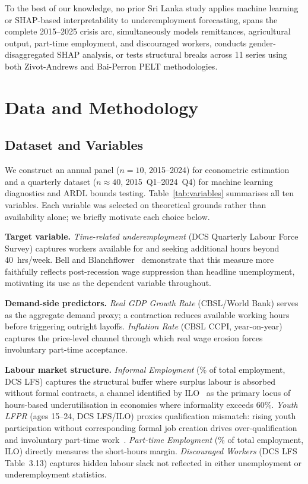 \documentclass[sigconf]{acmart}
\begin{document}
To the best of our knowledge, no prior Sri Lanka study applies machine
learning or SHAP-based interpretability to underemployment forecasting,
spans the complete 2015--2025 crisis arc, simultaneously models remittances,
agricultural output, part-time employment, and discouraged workers, conducts
gender-disaggregated SHAP analysis, or tests structural breaks across
11 series using both Zivot-Andrews and Bai-Perron PELT methodologies.

\section{Data and Methodology}

\subsection{Dataset and Variables}

We construct an annual panel ($n{=}10$, 2015--2024) for econometric
estimation and a quarterly dataset ($n{\approx}40$, 2015~Q1--2024~Q4)
for machine learning diagnostics and ARDL bounds testing.
Table~\ref{tab:variables} summarises all ten variables. Each variable
was selected on theoretical grounds rather than availability alone; we
briefly motivate each choice below.

\textbf{Target variable.} \emph{Time-related underemployment} (DCS
Quarterly Labour Force Survey) captures workers available for and seeking
additional hours beyond 40~hrs/week. Bell and
Blanchflower~\cite{bell2018underemployment} demonstrate that this
measure more faithfully reflects post-recession wage suppression than
headline unemployment, motivating its use as the dependent variable
throughout.

\textbf{Demand-side predictors.} \emph{Real GDP Growth Rate}
(CBSL/World Bank) serves as the aggregate demand proxy; a contraction
reduces available working hours before triggering outright layoffs.
\emph{Inflation Rate} (CBSL CCPI, year-on-year) captures the
price-level channel through which real wage erosion forces
involuntary part-time acceptance.

\textbf{Labour market structure.} \emph{Informal Employment} (\% of
total employment, DCS LFS) captures the structural buffer where
surplus labour is absorbed without formal contracts, a channel
identified by ILO~\cite{ilo2013,iloweso2024} as the primary locus of
hours-based underutilisation in economies where informality exceeds
60\%. \emph{Youth LFPR} (ages 15--24, DCS LFS/ILO) proxies
qualification mismatch: rising youth participation without
corresponding formal job creation drives over-qualification and
involuntary part-time work~\cite{oecd2017}. \emph{Part-time Employment}
(\% of total employment, ILO) directly measures the
short-hours margin. \emph{Discouraged Workers} (DCS LFS Table~3.13)
captures hidden labour slack not reflected in either unemployment or
underemployment statistics.
\end{document}
